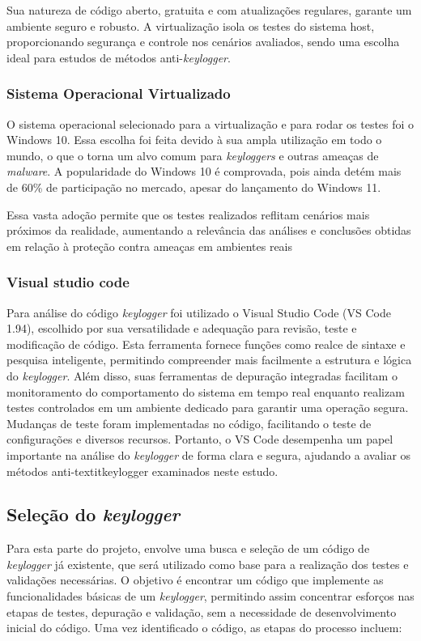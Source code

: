 \documentclass[12pt]{article}
\begin{document}
Sua natureza de código aberto, gratuita e com atualizações regulares, garante um ambiente seguro e robusto. A virtualização isola os testes do sistema host, proporcionando segurança e controle nos cenários avaliados, sendo uma escolha ideal para estudos de métodos anti-\textit{keylogger}.

\subsubsection{Sistema Operacional Virtualizado}

O sistema operacional selecionado para a virtualização e para rodar os testes foi o Windows 10. Essa escolha foi feita devido à sua ampla utilização em todo o mundo, o que o torna um alvo comum para \textit{keyloggers} e outras ameaças de \textit{malware}. A popularidade do Windows 10 é comprovada, pois ainda detém mais de 60\% de participação no mercado, apesar do lançamento do Windows 11. \citep{tomshardware2023}

Essa vasta adoção permite que os testes realizados reflitam cenários mais próximos da realidade, aumentando a relevância das análises e conclusões obtidas em relação à proteção contra ameaças em ambientes reais

\subsubsection{Visual studio code}
Para análise do código \textit{keylogger} foi utilizado o Visual Studio Code (VS Code 1.94), escolhido por sua versatilidade e adequação para revisão, teste e modificação de código. Esta ferramenta fornece funções como realce de sintaxe e pesquisa inteligente, permitindo compreender mais facilmente a estrutura e lógica do \textit{keylogger}. Além disso, suas ferramentas de depuração integradas facilitam o monitoramento do comportamento do sistema em tempo real enquanto realizam testes controlados em um ambiente dedicado para garantir uma operação segura. Mudanças de teste foram implementadas no código, facilitando o teste de configurações e diversos recursos. Portanto, o VS Code desempenha um papel importante na análise do \textit{keylogger} de forma clara e segura, ajudando a avaliar os métodos anti-textit{keylogger} examinados neste estudo.

\subsection{Seleção do \textit{keylogger}}
Para esta parte do projeto, envolve uma busca e seleção de um código de \textit{keylogger} já existente, que será utilizado como base para a realização dos testes e validações necessárias. O objetivo é encontrar um código que implemente as funcionalidades básicas de um \textit{keylogger}, permitindo assim concentrar esforços nas etapas de testes, depuração e validação, sem a necessidade de desenvolvimento inicial do código. Uma vez identificado o código, as etapas do processo incluem:
\end{document}

